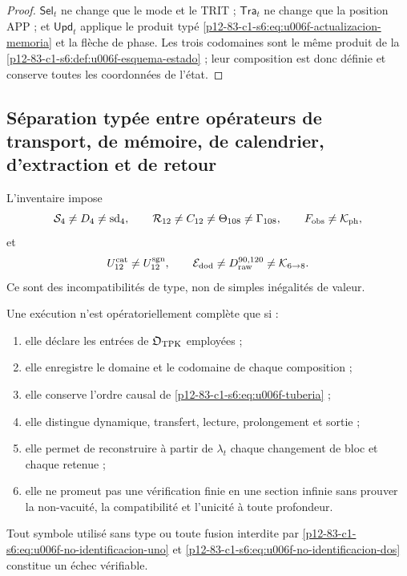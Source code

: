 {\begin{proof}
\(\mathsf{Sel}_t\) ne change que le mode et le TRIT ;
\(\mathsf{Tra}_t\) ne change que la position APP ; et
\(\mathsf{Upd}_t\) applique le produit typé
\eqref{p12-83-c1-s6:eq:u006f-actualizacion-memoria} et la flèche de phase. Les trois
codomaines sont le même produit de la
\cref{p12-83-c1-s6:def:u006f-esquema-estado} ; leur composition est donc définie et
conserve toutes les coordonnées de l’état.
\end{proof}

\subsection{Séparation typée entre opérateurs de transport, de mémoire, de calendrier, d’extraction et de retour}

L’inventaire impose
\begin{equation}
 \mathcal S_4\neq D_4\neq\operatorname{sd}_4,
 \qquad
 \mathcal R_{12}\neq C_{12}\neq\Theta_{108}\neq\Gamma_{108},
 \qquad
 F_{\rm obs}\neq\mathcal K_{\rm ph},
 \label{p12-83-c1-s6:eq:u006f-no-identificacion-uno}
\end{equation}
et
\begin{equation}
 U_{12}^{\rm cat}\neq U_{12}^{\rm sgn},
 \qquad
 \mathcal E_{\rm dod}\neq D_{\rm raw}^{90,120}
 \neq\mathcal K_{6\to8}.
 \label{p12-83-c1-s6:eq:u006f-no-identificacion-dos}
\end{equation}
Ce sont des incompatibilités de type, non de simples inégalités de valeur.

\begin{criterion}
\label{p12-83-c1-s6:crit:u006f-completitud}
Une exécution n’est opératoriellement complète que si :
\begin{enumerate}
 \item elle déclare les entrées de \(\mathfrak O_{\rm TPK}\) employées ;
 \item elle enregistre le domaine et le codomaine de chaque composition ;
 \item elle conserve l’ordre causal de \eqref{p12-83-c1-s6:eq:u006f-tuberia} ;
 \item elle distingue dynamique, transfert, lecture, prolongement et sortie ;
 \item elle permet de reconstruire à partir de \(\lambda_t\) chaque changement de bloc et
 chaque retenue ;
 \item elle ne promeut pas une vérification finie en une section infinie sans
 prouver la non-vacuité, la compatibilité et l’unicité à toute profondeur.
\end{enumerate}
Tout symbole utilisé sans type ou toute fusion interdite par
\eqref{p12-83-c1-s6:eq:u006f-no-identificacion-uno} et
\eqref{p12-83-c1-s6:eq:u006f-no-identificacion-dos} constitue un échec vérifiable.
\end{criterion}


}
